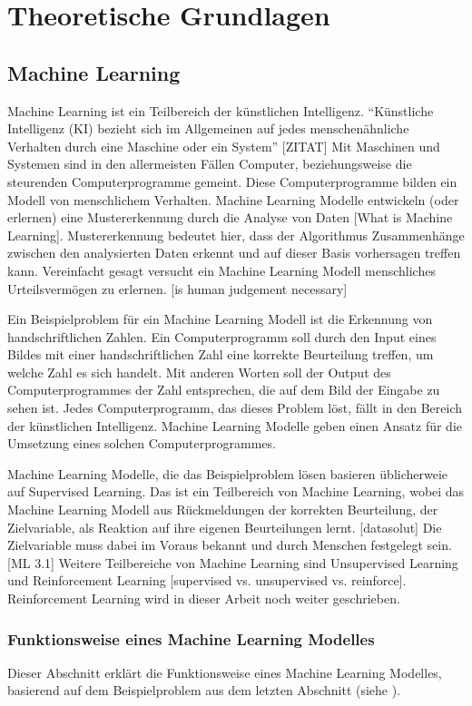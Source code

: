 \chapter{Theoretische Grundlagen}
\section{Machine Learning}
\label{chap:t_ml}
Machine Learning ist ein Teilbereich der künstlichen Intelligenz. ``Künstliche
Intelligenz (KI) bezieht sich im Allgemeinen auf jedes menschenähnliche
Verhalten durch eine Maschine oder ein System'' [ZITAT] Mit Maschinen und                
Systemen sind in den allermeisten Fällen Computer, beziehungsweise die
steurenden Computerprogramme gemeint. Diese Computerprogramme bilden ein Modell
von menschlichem Verhalten. Machine Learning Modelle entwickeln (oder erlernen)
eine Mustererkennung durch die Analyse von Daten [What is Machine Learning].
Mustererkennung bedeutet hier, dass der Algorithmus Zusammenhänge zwischen den
analysierten Daten erkennt und auf dieser Basis vorhersagen treffen kann.
Vereinfacht gesagt versucht ein Machine Learning Modell menschliches
Urteilsvermögen zu erlernen. [is human judgement necessary]

Ein Beispielproblem für ein Machine Learning Modell ist die Erkennung von
handschriftlichen Zahlen. Ein Computerprogramm soll durch den Input eines Bildes
mit einer handschriftlichen Zahl eine korrekte Beurteilung treffen, um welche
Zahl es sich handelt. Mit anderen Worten soll der Output des Computerprogrammes
der Zahl entsprechen, die auf dem Bild der Eingabe zu sehen ist. Jedes
Computerprogramm, das dieses Problem löst, fällt in den Bereich der künstlichen
Intelligenz. Machine Learning Modelle geben einen Ansatz für die Umsetzung eines
solchen Computerprogrammes.

Machine Learning Modelle, die das Beispielproblem lösen basieren üblicherweie
auf Supervised Learning. Das ist ein Teilbereich von Machine Learning, wobei das
Machine Learning Modell aus Rückmeldungen der korrekten Beurteilung, der
Zielvariable, als Reaktion auf ihre eigenen Beurteilungen lernt. [datasolut] Die
Zielvariable muss dabei im Voraus bekannt und durch Menschen festgelegt sein.
[ML 3.1] Weitere Teilbereiche von Machine Learning sind Unsupervised Learning
und Reinforcement Learning [supervised vs. unsupervised vs. reinforce].
Reinforcement Learning wird in dieser Arbeit noch weiter geschrieben.

\subsection{Funktionsweise eines Machine Learning Modelles}
\label{sub:funktionsweise}
Dieser Abschnitt erklärt die Funktionsweise eines Machine Learning Modelles,
basierend auf dem Beispielproblem aus dem letzten Abschnitt (siehe
). 

